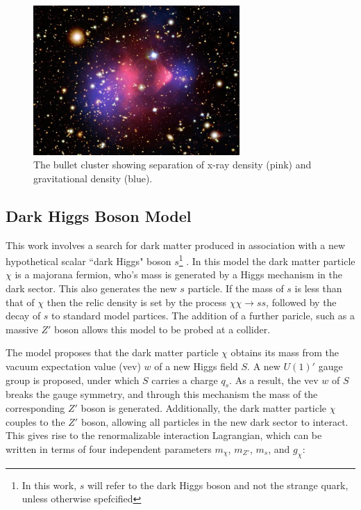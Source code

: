 \begin{figure}[H]
    \centering
    \includegraphics[width=0.7\textwidth]{Figures/1/bullet.png}
    \caption{The bullet cluster showing separation of x-ray density (pink) and gravitational density (blue).}
    \label{fig:bullet}
\end{figure}

\subsection{Dark Higgs Boson Model}
\label{subsection:dh_model}
This work involves a search for dark matter produced in association with a new hypothetical scalar ``dark Higgs" boson $s$\footnote{In this work, $s$ will refer  to the dark Higgs boson and not the strange quark, unless otherwise spefcified} \cite{Hunting}. In this model the dark matter particle $\chi$ is a majorana fermion, who's mass is generated by a Higgs mechanism in the dark sector. This also generates the new $s$ particle. If the mass of $s$ is less than that of $\chi$ then the relic density is set by the process $\chi\chi \rightarrow ss$, followed by the decay of $s$ to standard model partices. The addition of a further paricle, such as a massive $Z'$ boson allows this model to be probed at a collider.

The model proposes that the dark matter particle $\chi$ obtains its mass from the vacuum expectation value (vev) $w$ of a new Higgs field $S$. A new $U(1)'$ gauge group is proposed, under which $S$ carries a charge $q_s$. As a result, the vev $w$ of $S$ breaks the gauge symmetry, and through this mechanism the mass of the corresponding $Z'$ boson is generated. Additionally, the dark matter particle $\chi$ couples to the $Z'$ boson, allowing all particles in the new dark sector to interact. This gives rise to the renormalizable interaction Lagrangian, which can be written in terms of four independent parameters $m_{\chi}$, $m_{Z'}$, $m_{s}$, and $g_{\chi}$:


